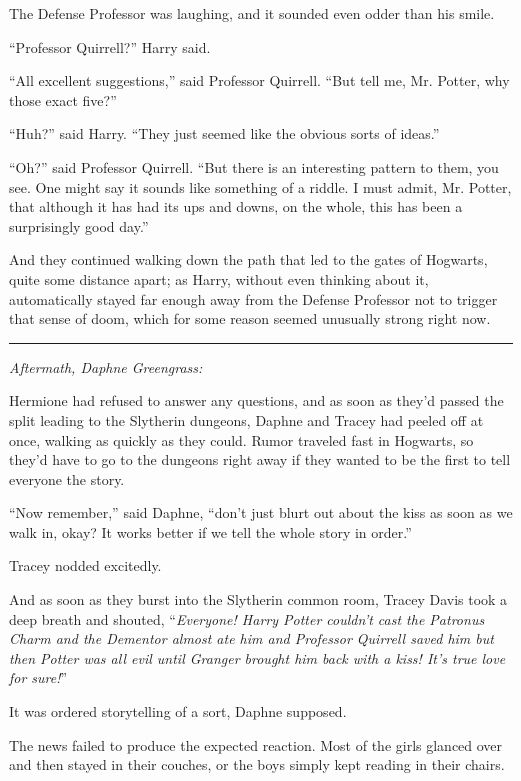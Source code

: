 The Defense Professor was laughing, and it sounded even odder than his smile.

``Professor Quirrell?'' Harry said.

``All excellent suggestions,'' said Professor Quirrell. ``But tell me, Mr. Potter, why those exact five?''

``Huh?'' said Harry. ``They just seemed like the obvious sorts of ideas.''

``Oh?'' said Professor Quirrell. ``But there is an interesting pattern to them, you see. One might say it sounds like something of a riddle. I must admit, Mr. Potter, that although it has had its ups and downs, on the whole, this has been a surprisingly good day.''

And they continued walking down the path that led to the gates of Hogwarts, quite some distance apart; as Harry, without even thinking about it, automatically stayed far enough away from the Defense Professor not to trigger that sense of doom, which for some reason seemed unusually strong right now.

\begin{center}\rule{3in}{0.4pt}\end{center}

\emph{Aftermath, Daphne Greengrass:}

Hermione had refused to answer any questions, and as soon as they'd passed the split leading to the Slytherin dungeons, Daphne and Tracey had peeled off at once, walking as quickly as they could. Rumor traveled fast in Hogwarts, so they'd have to go to the dungeons right away if they wanted to be the first to tell everyone the story.

``Now remember,'' said Daphne, ``don't just blurt out about the kiss as soon as we walk in, okay? It works better if we tell the whole story in order.''

Tracey nodded excitedly.

And as soon as they burst into the Slytherin common room, Tracey Davis took a deep breath and shouted, ``\emph{Everyone! Harry Potter couldn't cast the Patronus Charm and the Dementor almost ate him and Professor Quirrell saved him but then Potter was all evil until Granger brought him back with a kiss! It's true love for sure!}''

It was ordered storytelling of a sort, Daphne supposed.

The news failed to produce the expected reaction. Most of the girls glanced over and then stayed in their couches, or the boys simply kept reading in their chairs.

